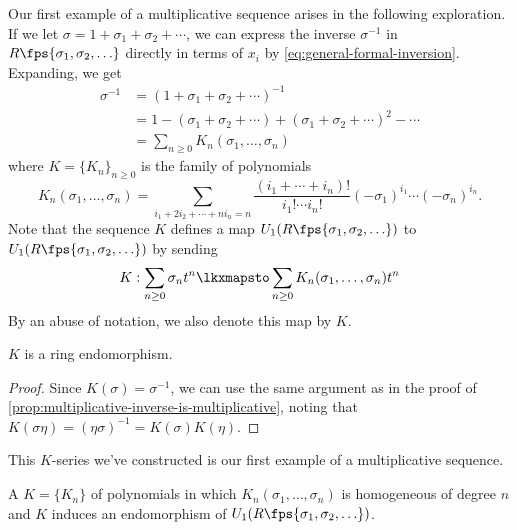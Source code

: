 Our first example of a multiplicative sequence arises in the following exploration.
If we let $\sigma=1+\sigma_1+\sigma_2+\cdots$, we can express the inverse $\sigma^{-1}$ in $R\fps{\sigma_1,\sigma_2,\ldots}$ directly in terms of $x_i$ by \cref{eq:general-formal-inversion}. Expanding, we get
	\begin{equation}\label{eq:chern-inverse-non-symmetric}
		\begin{aligned}
			\sigma^{-1} &= (1+\sigma_1+\sigma_2+\cdots)^{-1}\\
						 &= 1-(\sigma_1+\sigma_2+\cdots) + (\sigma_1+\sigma_2+\cdots)^2 - \cdots\\
						 &= \sum_{n\geq 0} K_n(\sigma_1,\ldots, \sigma_n)
		\end{aligned}
	\end{equation}
	where $K=\{K_n\}_{n\geq 0}$ is the family of polynomials 
	\begin{equation}\label{eq:inverse-K-series}
 		K_n(\sigma_1,\ldots, \sigma_n) = \sum_{i_1+2i_2+\cdots+ ni_n=n}\frac{(i_1+\cdots+i_n)!}{i_1!\cdots i_n!}(-\sigma_1)^{i_1}\cdots(-\sigma_n)^{i_n}.
	\end{equation}
	Note that the sequence $K$ defines a map $U_1(R\fps{\sigma_1,\sigma_2,\ldots})$ to $U_1(R\fps{\sigma_1,\sigma_2,\ldots})$ by sending
	\begin{equation}\label{eq:multiplicative-sequence-endomorphism}
		K : \sum_{n\geq 0} \sigma_n t^n \lkxmapsto \sum_{n\geq 0} K_n(\sigma_1,\ldots, \sigma_n) t^n
	\end{equation}
	By an abuse of notation, we also denote this map by $K$.

	\begin{proposition}
		$K$ is a ring endomorphism.
	\end{proposition}
	\begin{proof}
		Since $K(\sigma)=\sigma^{-1}$, we can use the same argument as in the proof of \cref{prop:multiplicative-inverse-is-multiplicative}, noting that $K(\sigma \eta)=(\eta \sigma)^{-1}=K(\sigma)K(\eta)$.
	\end{proof}

	This $K$-series we've constructed is our first example of a multiplicative sequence.

	\begin{definition}
		A  $K=\{K_n\}$ of polynomials in which $K_n(\sigma_1,\ldots, \sigma_n)$ is homogeneous of degree $n$ and $K$ induces an endomorphism of $U_1(R\fps{\sigma_1,\sigma_2,\ldots})$.
	\end{definition}
	
